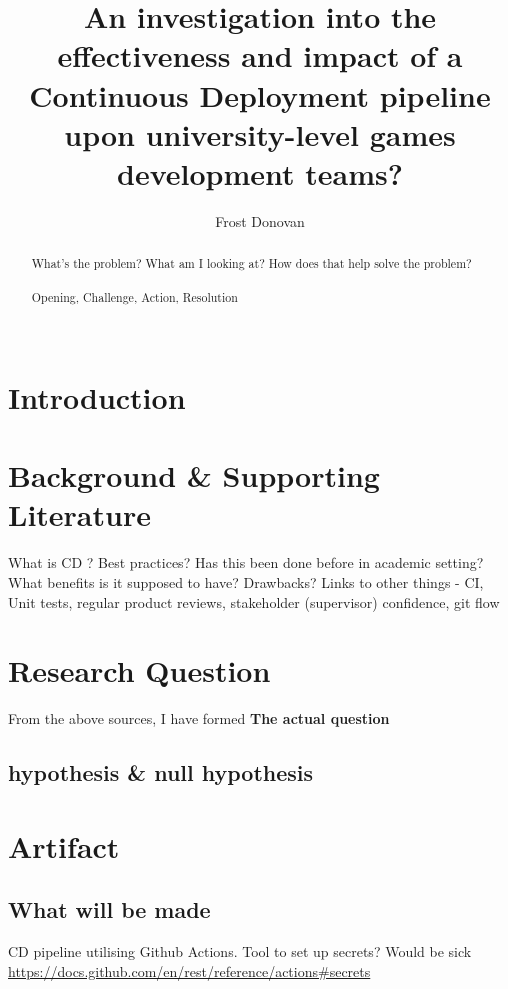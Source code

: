 \documentclass[lettersize,journal]{IEEEtran}
\begin{document}
\title{An investigation into the effectiveness and impact of a Continuous Deployment pipeline upon university-level games development teams?}

\author{Frost Donovan}

\maketitle

\begin{abstract}
    What's the problem? What am I looking at? How does that help solve the problem? \\
    \\
    Opening, Challenge, Action, Resolution \\
    \\
\end{abstract}

\section{Introduction}
    

\section{Background \& Supporting Literature}
    What is CD \cite{ContDelIntro,bamboo}? Best practices\cite{duvall2007continuous}? Has this been done before in academic setting\cite{CDCourse2014,CDMobileDev,Tornado,IndustryAcademyDenmark}? What benefits is it supposed to have\cite{ContDelIntro}? Drawbacks\cite{ContDelChall}? Links to other things - CI\cite{CICDCD}, Unit tests, regular product reviews, stakeholder (supervisor) confidence, git flow \cite{gitBranching}

\section{Research Question}
    From the above sources, I have formed \textbf{The actual question}
    \subsection{hypothesis \& null hypothesis}

\section{Artifact}
    \subsection{What will be made}
        CD pipeline utilising Github Actions. Tool to set up secrets? Would be sick \url{https://docs.github.com/en/rest/reference/actions#secrets}
\end{document}
